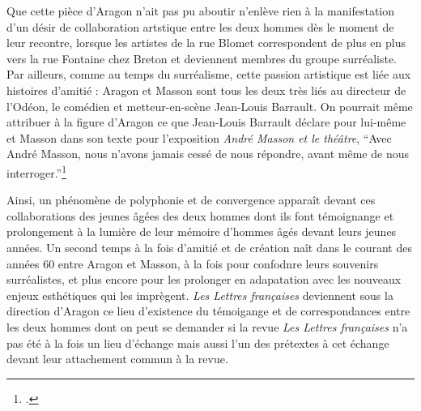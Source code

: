 	 Que cette pièce d'Aragon n'ait pas pu aboutir n'enlève rien à la manifestation d'un désir de collaboration artstique entre les deux hommes dès le moment de leur recontre, lorsque les artistes de la rue Blomet correspondent de plus en plus vers la rue Fontaine chez Breton et deviennent membres du groupe surréaliste. Par ailleurs, comme au temps du surréalisme, cette passion artistique est liée aux histoires d’amitié : Aragon et Masson sont tous les deux très liés au directeur de l’Odéon, le comédien et metteur-en-scène Jean-Louis Barrault. On pourrait même attribuer à la figure d'Aragon ce que Jean-Louis Barrault déclare pour lui-même et Masson dans son texte pour l'exposition \emph{André Masson et le théâtre}, \enquote{Avec André Masson, nous n'avons jamais cessé de nous répondre, avant même de nous interroger.}\footcite[p90]{catalogue}


	 Ainsi, un phénomène de polyphonie et de convergence apparaît devant ces collaborations des jeunes âgées des deux hommes dont ils font témoignange et prolongement à la lumière de leur mémoire d'hommes âgés devant leurs jeunes années. Un second temps à la fois d'amitié et de création naît dans le courant des années 60 entre Aragon et Masson, à la fois pour confodnre leurs souvenirs surréalistes, et plus encore pour les prolonger en adapatation avec les nouveaux enjeux esthétiques qui les imprègent. \emph{Les Lettres françaises} deviennent sous la direction d'Aragon ce lieu d'existence du témoigange et de correspondances entre les deux hommes dont on peut se demander si la revue \emph{Les Lettres françaises} n'a pas été à la fois un lieu d'échange mais aussi l'un des prétextes à cet échange devant leur attachement commun à la revue. 

 


